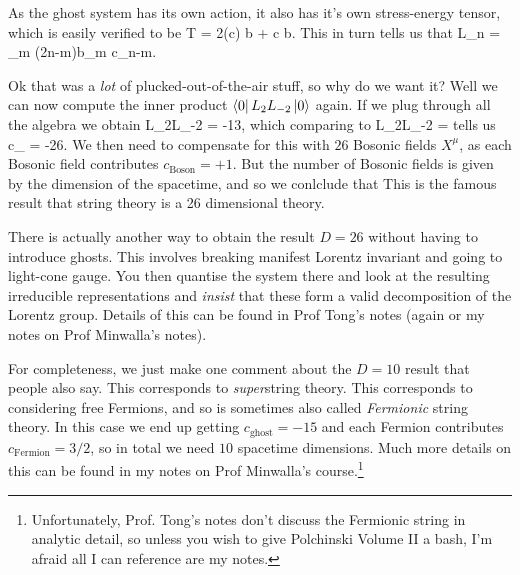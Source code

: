 As the ghost system has its own action, it also has it's own stress-energy tensor, which is easily verified to be 
\bse 
    T = 2(\p c) b + c \p b.
\ese 
This in turn tells us that 
\bse 
    L_n = \sum_m (2n-m)b_m c_{n-m}.
\ese 

Ok that was a \textit{lot} of plucked-out-of-the-air stuff, so why do we want it? Well we can now compute the inner product $\bra{0}L_2L_{-2}\ket{0}$ again. If we plug through all the algebra we obtain
\bse 
    L_2L_{-2}  = -13,
\ese
which comparing to 
\bse 
    L_2L_{-2} = 
\ese 
tells us
\bse 
    c_{} = -26.
\ese 
We then need to compensate for this with $26$ Bosonic fields $X^{\mu}$, as each Bosonic field contributes $c_{\text{Boson}}=+1$. But the number of Bosonic fields is given by the dimension of the spacetime, and so we conlclude that 
\noindent This is the famous result that string theory is a 26 dimensional theory. 

\br 
    There is actually another way to obtain the result $D=26$ without having to introduce ghosts. This involves breaking manifest Lorentz invariant and going to light-cone gauge. You then quantise the system there and look at the resulting irreducible representations and \textit{insist} that these form a valid decomposition of the Lorentz group. Details of this can be found in Prof Tong's notes (again or my notes on Prof Minwalla's notes).
\er 

\badr 
    For completeness, we just make one comment about the $D=10$ result that people also say. This corresponds to \textit{super}string theory. This corresponds to considering free Fermions, and so is sometimes also called \textit{Fermionic} string theory. In this case we end up getting $c_{\text{ghost}}=-15$ and each Fermion contributes $c_{\text{Fermion}} = 3/2$, so in total we need $10$ spacetime dimensions. Much more details on this can be found in my notes on Prof Minwalla's course.\footnote{Unfortunately, Prof. Tong's notes don't discuss the Fermionic string in analytic detail, so unless you wish to give Polchinski Volume II a bash, I'm afraid all I can reference are my notes.}
\eadr 